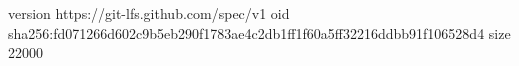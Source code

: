 version https://git-lfs.github.com/spec/v1
oid sha256:fd071266d602c9b5eb290f1783ae4c2db1ff1f60a5ff32216ddbb91f106528d4
size 22000
